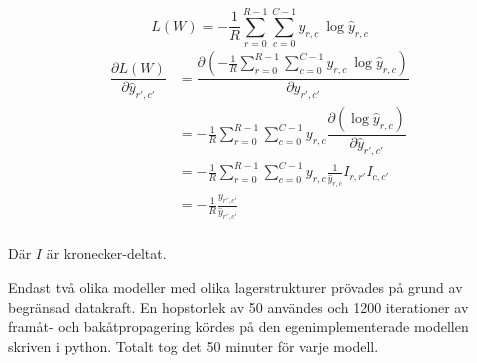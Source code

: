 \documentclass[a4paper,11pt,twoside]{article}
\newcommand*{\pd}[2]{\ensuremath{\dfrac{\partial #1}{\partial #2}}}
\begin{document}
\begin{equation}
L(W) = - \frac{1}{R}\sum^{R-1}_{r=0} \sum^{C-1}_{c=0}y_{r,c} \ \log{\hat{y}_{r,c}}
\end{equation}
\begin{equation}
\begin{split}
\pd{L(W)}{\hat{y}_{r',c'}} 
	& = \pd{\left(-\frac{1}{R}\sum^{R-1}_{r=0} \sum^{C-1}_{c=0}y_{r,c} \ \log{\hat{y}_{r,c}}\right)}{\hat{y}_{r',c'}} \\
	& = -\frac{1}{R}\sum^{R-1}_{r=0} \sum^{C-1}_{c=0}y_{r,c} \pd{\left(\log{\hat{y}_{r,c}}\right)}{\hat{y}_{r',c'}} \\
	& = - \frac{1}{R}\sum^{R-1}_{r=0} \sum^{C-1}_{c=0} y_{r,c} \frac{1}{\hat{y}_{r,c}} I_{r, r'} I_{c, c'}\\
	& = - \frac{1}{R} \frac{y_{r',c'}}{\hat{y}_{r',c'}} \\
\end{split}
\end{equation}

Där $I$ är kronecker-deltat.

Endast två olika modeller med olika lagerstrukturer prövades på grund av begränsad datakraft. En hopstorlek av 50 användes och 1200 iterationer av framåt- och bakåtpropagering kördes på den egenimplementerade modellen skriven i python. Totalt tog det 50 minuter för varje modell.
\end{document}
